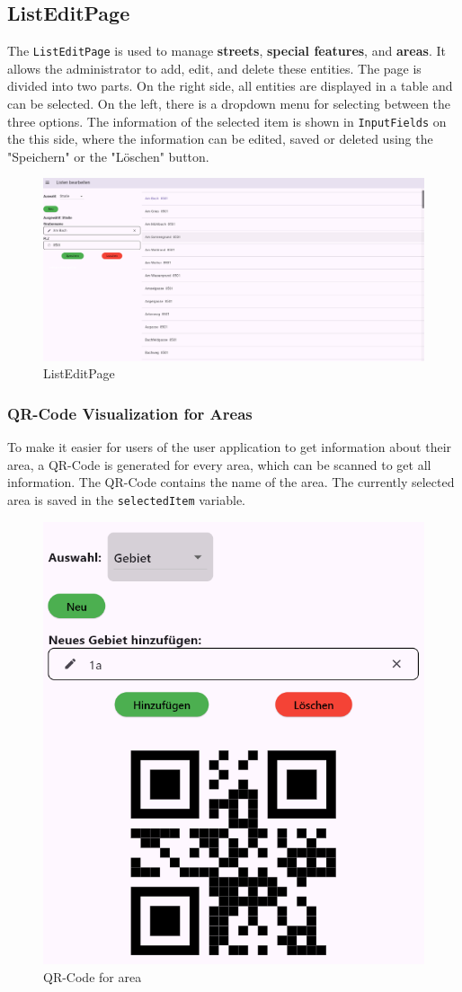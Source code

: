  

\subsection{ListEditPage}
The \texttt{ListEditPage} is used to manage \textbf{streets}, \textbf{special features}, and \textbf{areas}. It allows the administrator to add, edit, and delete these entities. The page is divided into two parts. On the right side, all entities are displayed in a table and can be selected. On the left, there is a dropdown menu for selecting between the three options. The information of the selected item is shown in \texttt{InputFields} on the this side, where the information can be edited, saved or deleted using the "Speichern" or the "Löschen" button.

\begin{figure}[H]
    \centering
    \includegraphics[width=0.9\linewidth]{images/AdminPanel/ListEditPage.png}
    \caption{ListEditPage}
\end{figure}

\subsubsection{QR-Code Visualization for Areas}
To make it easier for users of the user application to get information about their area, a QR-Code is generated for every area, which can be scanned to get all information. The QR-Code contains the name of the area. The currently selected area is saved in the \texttt{selectedItem} variable.

\begin{figure}[H]
    \centering
    \includegraphics[width=0.4\linewidth]{images/AdminPanel/QrImageView.png}
    \caption{QR-Code for area}
\end{figure}


